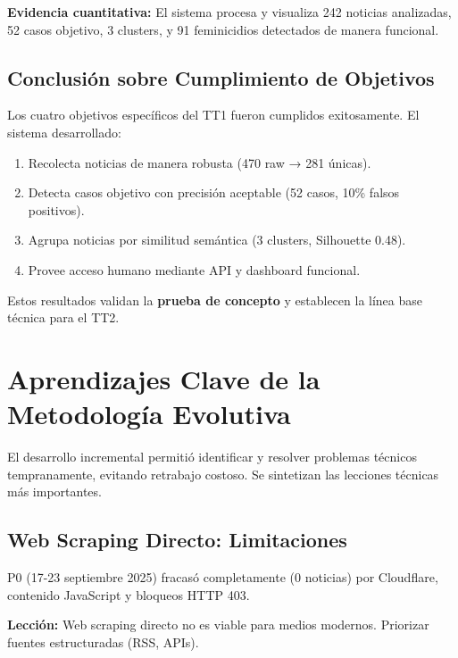 \textbf{Evidencia cuantitativa:} El sistema procesa y visualiza 242 noticias analizadas, 52 casos objetivo, 3 clusters, y 91 feminicidios detectados de manera funcional.

\subsection{Conclusión sobre Cumplimiento de Objetivos}
\label{subsec:conclusion_objetivos}

Los cuatro objetivos específicos del TT1 fueron cumplidos exitosamente. El sistema desarrollado:

\begin{enumerate}
    \item Recolecta noticias de manera robusta (470 raw → 281 únicas).
    \item Detecta casos objetivo con precisión aceptable (52 casos, 10\% falsos positivos).
    \item Agrupa noticias por similitud semántica (3 clusters, Silhouette 0.48).
    \item Provee acceso humano mediante API y dashboard funcional.
\end{enumerate}

Estos resultados validan la \textbf{prueba de concepto} y establecen la línea base técnica para el TT2.

\section{Aprendizajes Clave de la Metodología Evolutiva}
\label{sec:aprendizajes}

El desarrollo incremental permitió identificar y resolver problemas técnicos tempranamente, evitando retrabajo costoso. Se sintetizan las lecciones técnicas más importantes.

\subsection{Web Scraping Directo: Limitaciones}
\label{subsec:leccion_scraping}

P0 (17-23 septiembre 2025) fracasó completamente (0 noticias) por Cloudflare, contenido JavaScript y bloqueos HTTP 403.

\textbf{Lección:} Web scraping directo no es viable para medios modernos. Priorizar fuentes estructuradas (RSS, APIs).

